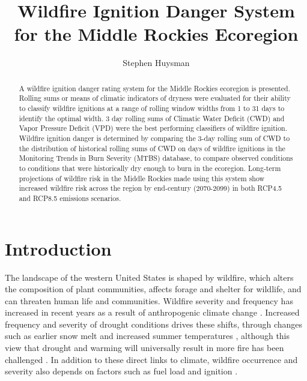 \documentclass[11pt]{article}
\author{Stephen Huysman}
\title{Wildfire Ignition Danger System for the Middle Rockies Ecoregion}
\begin{document}
\maketitle


\begin{abstract}
A wildfire ignition danger rating system for the Middle Rockies ecoregion is presented. Rolling sums or means of climatic indicators of dryness were evaluated for their ability to classify wildfire ignitions at a range of rolling window widths from 1 to 31 days to identify the optimal width.  3 day rolling sums of Climatic Water Deficit (CWD) and Vapor Pressure Deficit (VPD) were the best performing classifiers of wildfire ignition. Wildfire ignition danger is determined by comparing the 3-day rolling sum of CWD to the distribution of historical rolling sums of CWD on days of wildfire ignitions in the Monitoring Trends in Burn Severity (MTBS) database, to compare observed conditions to conditions that were historically dry enough to burn in the ecoregion. Long-term projections of wildfire risk in the Middle Rockies made using this system show increased wildfire risk across the region by end-century (2070-2099) in both RCP4.5 and RCP8.5 emissions scenarios.
  
\end{abstract}

\section{Introduction}

The landscape of the western United States is shaped by wildfire, which alters the composition of plant communities, affects forage and shelter for wildlife, and can threaten human life and communities.  Wildfire severity and frequency has increased in recent years as a result of anthropogenic climate change \citep{abatzoglouImpactAnthropogenicClimate2016,runningGlobalWarmingCausing2006,boerChangingWeatherExtremes2017,littellReviewRelationshipsDrought2016}.  Increased frequency and severity of drought conditions drives these shifts, through changes such as earlier snow melt \citep{tercekForecasts21stCentury2016} and increased summer temperatures \citep{runningGlobalWarmingCausing2006}, although this view that drought and warming will universally result in more fire has been challenged \citep{littellClimateChangeFuture2018}.  In addition to these direct links to climate, wildfire occurrence and severity also depends on factors such as fuel load and ignition \citep{mckenzieClimateChangeEcohydrology2017}.
\end{document}
